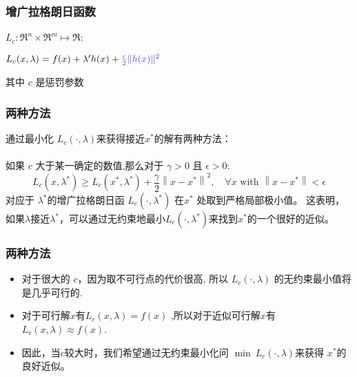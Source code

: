 \documentclass[handout,10pt]{beamer} %
\begin{document}
\begin{frame}
\frametitle{增广拉格朗日函数}
 $L_{c}: \Re^{n} \times \Re^{m} \mapsto \Re$: %
\begin{center}
$L_{c}(x, \lambda)=f(x)+\lambda^{\prime} h(x)+ \hint{\frac{c}{2}\|h(x)\|^{2}}$
\end{center}
其中 $c$ 是惩罚参数
\end{frame}

\begin{frame}
\frametitle{两种方法}
通过最小化 $L_{c}(\cdot, \lambda)$来获得接近$x^{*}$的解有两种方法：\\
       \\
 如果 $c$ 大于某一确定的数值,那么对于 $\gamma>0$ 且 $\epsilon>0$:
$$
L_{c}\left(x, \lambda^{*}\right) \geq L_{c}\left(x^{*}, \lambda^{*}\right)+\frac{\gamma}{2}\left\|x-x^{*}\right\|^{2}, \quad \forall x \text { with }\left\|x-x^{*}\right\|<\epsilon
$$
对应于 $\lambda^{*}$的增广拉格朗日函 $L_{c}\left(\cdot, \lambda^{*}\right)$ 在$x^{*}$ 处取到严格局部极小值。 这表明，如果$\lambda$接近$\lambda^{*}$，可以通过无约束地最小$L_{c}\left(\cdot, \lambda^{*}\right)$来找到$x^{*}$的一个很好的近似。
\end{frame}


\begin{frame}
\frametitle{两种方法}

\begin{itemize}
  \item
对于很大的 $c$，因为取不可行点的代价很高,  所以 $L_{c}(\cdot, \lambda)$ 的无约束最小值将是几乎可行的.

  \item 对于可行解$x$有$L_{c}(x, \lambda)=f(x)$ ,所以对于近似可行解$x$有 $L_{c}(x, \lambda) \approx f(x)$.

   \item 因此，当$c$较大时，我们希望通过无约束最小化问 $\min\ L_{c}(\cdot, \lambda)$来获得 $x^{*}$的良好近似。
\end{itemize}
\end{frame}
\end{document}
